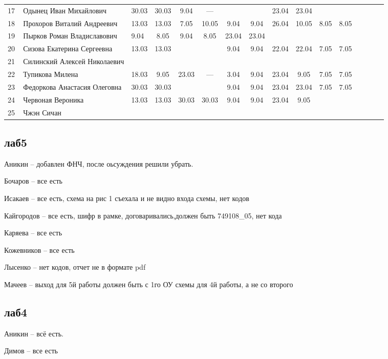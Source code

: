\documentclass[a4paper,11pt]{article}
\begin{document}
\begin{tabular}{l|llccccccccccccc}
17\,&Одынец Иван Михайлович         &30.03&30.03 & 9.04& --- &     &     &23.04&23.04\\
18\,&Прохоров Виталий Андреевич     &13.03&13.03 & 7.05&10.05& 9.04& 9.04&26.04&10.05& 8.05& 8.05\\
19\,&Пырков Роман Владиславович     & 9.04& 8.05 & 9.04& 8.05&23.04&23.04&&\\
20\,&Сизова Екатерина Сергеевна     &13.03&13.03 &     &     & 9.04& 9.04&22.04&22.04& 7.05& 7.05\\
\midrule
21\,&Силинский Алексей Николаевич   &     &      &     &     &     &     &     &\\
22\,&Тупикова Милена                &18.03& 9.05 &23.03& --- & 3.04& 9.04&23.04& 9.05& 7.05& 7.05\\
23\,&Федоркова Анастасия Олеговна   &30.03&30.03 &     &     & 9.04& 9.04&23.04&23.04& 7.05&7.05\\
24\,&Червоная Вероника              &13.03&13.03 &30.03&30.03& 9.04& 9.04&23.04& 9.05&     &\\
25\,&Чжэн Сичан                     &     &      &     &     &     &     &\\
\bottomrule
\end{tabular}

\newpage
{}
\recalctypearea
\subsection*{лаб5}
Аникин -- добавлен ФНЧ, после оьсуждения решили убрать.

Бочаров -- все есть

Исакаев -- все есть, схема на рис 1 съехала и не видно входа схемы, нет кодов

Кайгородов -- все есть, шифр в рамке, договаривались,должен быть 749108\_05, нет кода

Каряева -- все есть

Кожевников -- все есть

Лысенко -- нет кодов, отчет не в формате pdf

Мачеев -- выход для 5й работы должен быть с 1го ОУ схемы для 4й работы, а не со второго 

\newpage
\subsection*{лаб4}
Аникин -- всё есть.

Димов -- все есть
\end{document}
